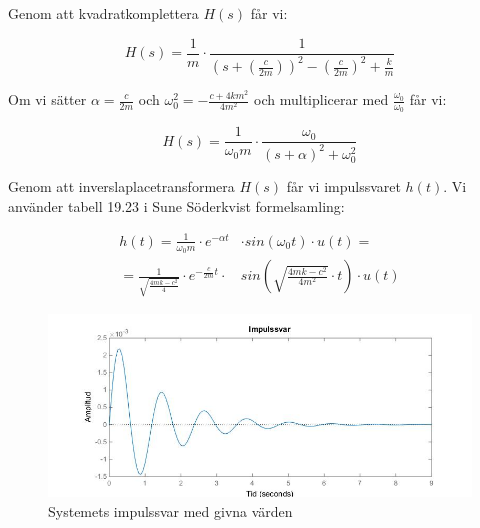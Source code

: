 \documentclass[10pt,a4paper]{article}
\begin{document}
Genom att kvadratkomplettera $H(s)$ får vi:

\begin{equation}
H(s) = \frac{1}{m} \cdot \frac{1}{(s+(\frac{c}{2  m}))^2-(\frac{c}{2  m})^2+\frac{k}{m}} 
\end{equation}

Om vi sätter $\alpha = \frac{c}{2m}$ och $\omega_0^2 = {-\frac{c + 4 k  m^2}{4  m^2}}$ och multiplicerar med $\frac{\omega_0}{\omega_0}$ får vi:

\begin{equation}
H(s) = \frac{1}{\omega_0  m} \cdot \frac{\omega_0}{(s + \alpha)^2 +\omega_0^2}
\end{equation}

Genom att inverslaplacetransformera $H(s)$ får vi impulssvaret $h(t)$. Vi använder tabell 19.23 i Sune Söderkvist formelsamling:

\begin{equation}
\begin{split}
h(t) = \frac{1}{\omega_0  m} \cdot  e^{-\alpha  t} & \cdot  sin(\omega_0  t) \cdot u(t) = \\ = \frac{1}{\sqrt{\frac{4  m  k - c^2}{4}} } \cdot  e^{-\frac{c}{2m} t} \cdot & sin(\sqrt{\frac{4  m  k - c^2}{4  m^2}} \cdot t) \cdot u(t)
\end{split}
\end{equation}



\begin{figure}[h]
\begin{center}

\includegraphics[scale=0.5]{Impulssvar}
\caption{Systemets impulssvar med givna värden}
\end{center}
\end{figure}
\end{document}
